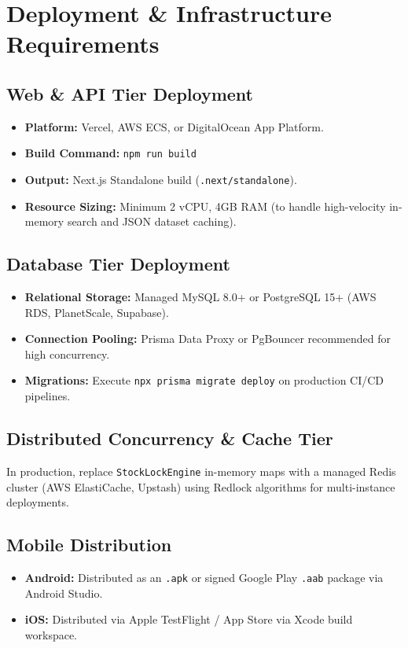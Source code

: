 \documentclass[10pt,a4paper]{article}
\begin{document}
\section{Deployment \& Infrastructure Requirements}

\subsection{Web \& API Tier Deployment}
\begin{itemize}[leftmargin=*]
    \item \textbf{Platform:} Vercel, AWS ECS, or DigitalOcean App Platform.
    \item \textbf{Build Command:} \texttt{npm run build}
    \item \textbf{Output:} Next.js Standalone build (\texttt{.next/standalone}).
    \item \textbf{Resource Sizing:} Minimum 2 vCPU, 4GB RAM (to handle high-velocity in-memory search and JSON dataset caching).
\end{itemize}

\subsection{Database Tier Deployment}
\begin{itemize}[leftmargin=*]
    \item \textbf{Relational Storage:} Managed MySQL 8.0+ or PostgreSQL 15+ (AWS RDS, PlanetScale, Supabase).
    \item \textbf{Connection Pooling:} Prisma Data Proxy or PgBouncer recommended for high concurrency.
    \item \textbf{Migrations:} Execute \texttt{npx prisma migrate deploy} on production CI/CD pipelines.
\end{itemize}

\subsection{Distributed Concurrency \& Cache Tier}
In production, replace \texttt{StockLockEngine} in-memory maps with a managed Redis cluster (AWS ElastiCache, Upstash) using Redlock algorithms for multi-instance deployments.

\subsection{Mobile Distribution}
\begin{itemize}[leftmargin=*]
    \item \textbf{Android:} Distributed as an \texttt{.apk} or signed Google Play \texttt{.aab} package via Android Studio.
    \item \textbf{iOS:} Distributed via Apple TestFlight / App Store via Xcode build workspace.
\end{itemize}
\end{document}
